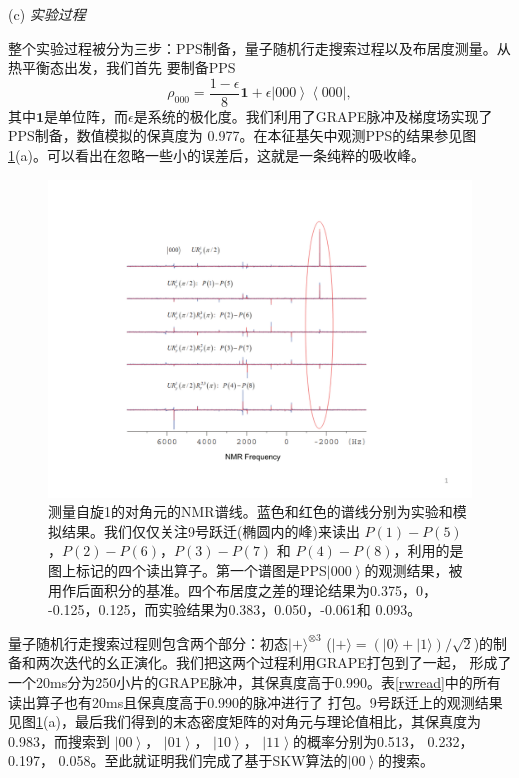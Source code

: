(c) \emph{实验过程}

整个实验过程被分为三步：PPS制备，量子随机行走搜索过程以及布居度测量。从热平衡态出发，我们首先
要制备PPS
\begin{equation}
\rho_{000}=\frac{1-\epsilon
}{8}\mathbf{1}+\epsilon \left\vert 000 \right\rangle \left\langle
000\right\vert,
\end{equation}
其中$\mathbf{1}$是单位阵，而$\epsilon$是系统的极化度。我们利用了GRAPE脉冲及梯度场实现了PPS制备，数值模拟的保真度为
0.977。在本征基矢中观测PPS的结果参见图\ref{rwspec}(a)。可以看出在忽略一些小的误差后，这就是一条纯粹的吸收峰。

\begin{figure}[htbp]
            \begin{center}
              \includegraphics[width= 0.8\columnwidth]{figures/rwspec.pdf}
              \caption{测量自旋1的对角元的NMR谱线。蓝色和红色的谱线分别为实验和模拟结果。我们仅仅关注9号跃迁(椭圆内的峰)来读出
$P(1)-P(5)$，$P(2)-P(6)$，$P(3)-P(7)$ 和 $P(4)-P(8)$，利用的是图上标记的四个读出算子。第一个谱图是PPS$\left\vert
000 \right\rangle$的观测结果，被用作后面积分的基准。四个布居度之差的理论结果为0.375，0， -0.125，0.125，而实验结果为0.383，0.050，-0.061和 0.093。}
              \label{rwspec}
            \end{center}
 \end{figure}

量子随机行走搜索过程则包含两个部分：初态$|+\rangle^{\otimes3}$
($|+\rangle=(|0\rangle+|1\rangle)/\sqrt{2}$)的制备和两次迭代的幺正演化。我们把这两个过程利用GRAPE打包到了一起，
形成了一个20ms分为250小片的GRAPE脉冲，其保真度高于0.990。表\ref{rwread}中的所有读出算子也有20ms且保真度高于0.990的脉冲进行了
打包。9号跃迁上的观测结果见图\ref{rwspec}(a)，最后我们得到的末态密度矩阵的对角元与理论值相比，其保真度为0.983，而搜索到
$\left\vert 00
\right\rangle$， $\left\vert 01 \right\rangle$， $\left\vert
10 \right\rangle$， $\left\vert 11 \right\rangle$的概率分别为0.513， 0.232，0.197， 0.058。至此就证明我们完成了基于SKW算法的$\left\vert 00 \right\rangle$的搜索。

